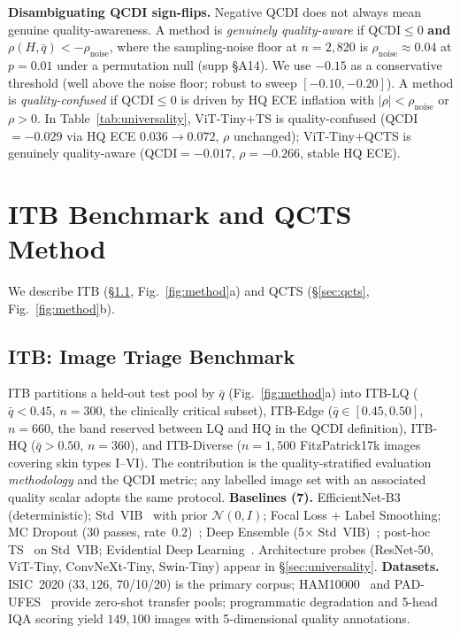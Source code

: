 \documentclass{bmvc2k}
\newcommand{\qbar}{\bar{q}}
\begin{document}
\textbf{Disambiguating QCDI sign-flips.}
Negative QCDI does not always mean genuine quality-awareness. A method is \emph{genuinely quality-aware} if QCDI${\le}0$ \textbf{and} $\rho(H,\qbar){<}-\rho_\text{noise}$, where the sampling-noise floor at $n{=}2{,}820$ is $\rho_\text{noise}{\approx}0.04$ at $p{=}0.01$ under a permutation null (supp \S A14). We use $-0.15$ as a conservative threshold (well above the noise floor; robust to sweep $[-0.10,-0.20]$). A method is \emph{quality-confused} if QCDI${\le}0$ is driven by HQ ECE inflation with $|\rho|{<}\rho_\text{noise}$ or $\rho{>}0$. In Table~\ref{tab:universality}, ViT-Tiny$+$TS is quality-confused (QCDI${=}{-}0.029$ via HQ ECE $0.036\to0.072$, $\rho$ unchanged); ViT-Tiny$+$QCTS is genuinely quality-aware (QCDI${=}{-}0.017$, $\rho{=}{-}0.266$, stable HQ ECE).

\section{ITB Benchmark and QCTS Method}
\label{sec:method}

We describe ITB (\S\ref{sec:itb}, Fig.~\ref{fig:method}a) and QCTS (\S\ref{sec:qcts}, Fig.~\ref{fig:method}b).

\subsection{ITB: Image Triage Benchmark}
\label{sec:itb}

ITB partitions a held-out test pool by $\qbar$ (Fig.~\ref{fig:method}a) into ITB-LQ ($\qbar{<}0.45$, $n{=}300$, the clinically critical subset), ITB-Edge ($\qbar\in[0.45,0.50]$, $n{=}660$, the band reserved between LQ and HQ in the QCDI definition), ITB-HQ ($\qbar{>}0.50$, $n{=}360$), and ITB-Diverse ($n{=}1{,}500$ FitzPatrick17k images covering skin types I--VI). The contribution is the quality-stratified evaluation \emph{methodology} and the QCDI metric; any labelled image set with an associated quality scalar adopts the same protocol. \textbf{Baselines (7).} EfficientNet-B3 (deterministic); Std~VIB~\cite{alemi2017vib} with prior $\mathcal{N}(0,I)$; Focal Loss + Label Smoothing; MC Dropout (30 passes, rate~0.2)~\cite{gal2016dropout}; Deep Ensemble (5$\times$ Std~VIB)~\cite{lakshminarayanan2017ensemble}; post-hoc TS~\cite{guo2017calibration} on Std~VIB; Evidential Deep Learning~\cite{sensoy2018evidential}. Architecture probes (ResNet-50, ViT-Tiny, ConvNeXt-Tiny, Swin-Tiny) appear in \S\ref{sec:universality}. \textbf{Datasets.} ISIC~2020 ($33{,}126$, 70/10/20) is the primary corpus; HAM10000~\cite{tschandl2019ham10000} and PAD-UFES~\cite{pacheco2020pad} provide zero-shot transfer pools; programmatic degradation and 5-head IQA scoring yield $149{,}100$ images with 5-dimensional quality annotations.
\end{document}
